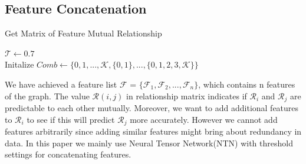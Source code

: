 \documentclass[sigconf]{acmart}
\begin{document}
\subsection{Feature Concatenation}
\begin{algorithm}
  \caption{Get Matrix of Feature Mutual Relationship}
  $\mathcal T \gets 0.7$\\
  Initalize $Comb \gets \{0,1,...,\mathcal K, \{0,1\},...,\{0,1,2,3,\mathcal K\}\}$ \\

  \end{algorithm}
  We have achieved a feature list $\mathcal F$ = $\{ \mathcal F_{1}, \mathcal F_{2},..., \mathcal F_{n}\}$, which contains n 
  features of the graph. The value $\mathcal R(i,j)$ in relationship matrix indicates if $ \mathcal R_{i}$ and
  $\mathcal R_{j}$ are predictable to each other mutually. Moreover, we want to add additional features to $\mathcal R_{i}$
  to see if this will predict $\mathcal R_{j}$ more accurately. However we cannot add features arbitrarily since adding similar features might 
  bring about redundancy in data. In this paper we mainly use Neural Tensor Network(NTN) with threshold settings for concatenating features.
  
\end{document}
